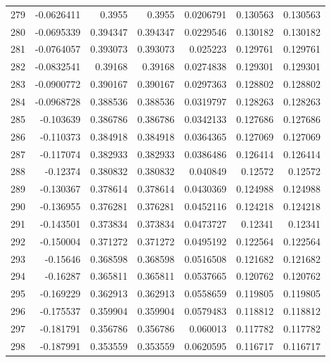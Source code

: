\begin{tabular}{rrrrrrr}
 279 & -0.0626411   & 0.3955      & 0.3955      &  0.0206791   & 0.130563    & 0.130563    \\
 280 & -0.0695339   & 0.394347    & 0.394347    &  0.0229546   & 0.130182    & 0.130182    \\
 281 & -0.0764057   & 0.393073    & 0.393073    &  0.025223    & 0.129761    & 0.129761    \\
 282 & -0.0832541   & 0.39168     & 0.39168     &  0.0274838   & 0.129301    & 0.129301    \\
 283 & -0.0900772   & 0.390167    & 0.390167    &  0.0297363   & 0.128802    & 0.128802    \\
 284 & -0.0968728   & 0.388536    & 0.388536    &  0.0319797   & 0.128263    & 0.128263    \\
 285 & -0.103639    & 0.386786    & 0.386786    &  0.0342133   & 0.127686    & 0.127686    \\
 286 & -0.110373    & 0.384918    & 0.384918    &  0.0364365   & 0.127069    & 0.127069    \\
 287 & -0.117074    & 0.382933    & 0.382933    &  0.0386486   & 0.126414    & 0.126414    \\
 288 & -0.12374     & 0.380832    & 0.380832    &  0.040849    & 0.12572     & 0.12572     \\
 289 & -0.130367    & 0.378614    & 0.378614    &  0.0430369   & 0.124988    & 0.124988    \\
 290 & -0.136955    & 0.376281    & 0.376281    &  0.0452116   & 0.124218    & 0.124218    \\
 291 & -0.143501    & 0.373834    & 0.373834    &  0.0473727   & 0.12341     & 0.12341     \\
 292 & -0.150004    & 0.371272    & 0.371272    &  0.0495192   & 0.122564    & 0.122564    \\
 293 & -0.15646     & 0.368598    & 0.368598    &  0.0516508   & 0.121682    & 0.121682    \\
 294 & -0.16287     & 0.365811    & 0.365811    &  0.0537665   & 0.120762    & 0.120762    \\
 295 & -0.169229    & 0.362913    & 0.362913    &  0.0558659   & 0.119805    & 0.119805    \\
 296 & -0.175537    & 0.359904    & 0.359904    &  0.0579483   & 0.118812    & 0.118812    \\
 297 & -0.181791    & 0.356786    & 0.356786    &  0.060013    & 0.117782    & 0.117782    \\
 298 & -0.187991    & 0.353559    & 0.353559    &  0.0620595   & 0.116717    & 0.116717    \\

\end{tabular}
